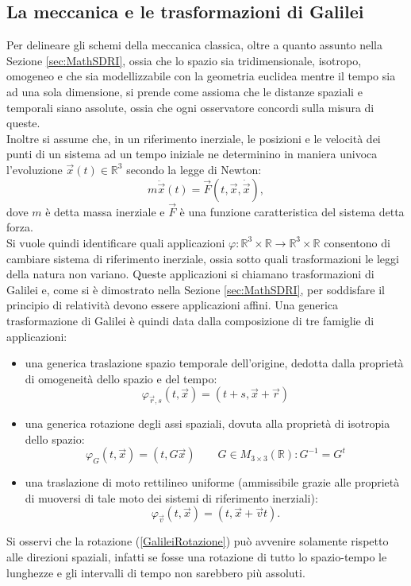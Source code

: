 \subsection{La meccanica e le trasformazioni di Galilei}\label{sec:MC}
Per delineare gli schemi della meccanica classica, oltre a quanto assunto nella Sezione \ref{sec:MathSDRI}, ossia che lo spazio sia tridimensionale, isotropo, omogeneo e che sia modellizzabile con la geometria euclidea mentre il tempo sia ad una sola dimensione, si prende come assioma che le distanze spaziali e temporali siano assolute, ossia che ogni osservatore concordi sulla misura di queste.\\
Inoltre si assume che, in un riferimento inerziale, le posizioni e le velocità dei punti di un sistema ad un tempo iniziale ne determinino in maniera univoca l'evoluzione $\vec x(t)\in \mathbb{R}^3$ secondo la legge di Newton:
\begin{equation}
	m\ddot{\vec{x}}(t)=\vec{F}(t,\vec{x},\dot{\vec{x}}),
	\label{equazioneDiNewton}
\end{equation}
dove $m$ è detta massa inerziale e $\vec{F}$ è una funzione caratteristica del sistema detta forza.\\

Si vuole quindi identificare quali applicazioni $\varphi:\mathbb{R}^3\times\mathbb{R}\rightarrow
\mathbb{R}^3\times\mathbb{R}$ consentono di cambiare sistema di riferimento inerziale, ossia sotto quali 
trasformazioni le leggi della natura non variano. Queste applicazioni si chiamano trasformazioni di 
Galilei e, come si è dimostrato nella Sezione \ref{sec:MathSDRI}, per soddisfare il principio di relatività devono essere applicazioni affini.
Una generica trasformazione di Galilei è quindi data dalla composizione di tre famiglie di applicazioni:
\begin{itemize}
	\item una generica traslazione spazio temporale dell'origine, dedotta dalla proprietà 
	di omogeneità dello spazio e del tempo:
	\begin{equation}
		\varphi_{\vec{r},s}(t,\vec{x})=(t+s,\vec{x}+\vec{r})
		\label{GalileiTraslazoine}
	\end{equation} 
\item una generica rotazione degli assi spaziali, dovuta alla proprietà di isotropia dello spazio:
\begin{equation}
	\varphi_{G}(t,\vec{x})=(t,G\vec{x}) \qquad G\in M_{3\times3}(\mathbb{R}):G^{-1}=G^t
	\label{GalileiRotazione}
\end{equation} 
	\item una traslazione di moto rettilineo uniforme (ammissibile grazie alle proprietà di muoversi di tale moto dei sistemi 
	di riferimento inerziali):
\begin{equation}
	\varphi_{\vec{v}}(t,\vec{x})=(t,\vec{x}+\vec{v}t).
	\label{GalileiVelocità}
\end{equation} 
\end{itemize}
Si osservi che la rotazione (\ref{GalileiRotazione}) può avvenire solamente rispetto alle direzioni spaziali, infatti se fosse una rotazione di tutto lo spazio-tempo le lunghezze e gli intervalli di tempo non sarebbero più assoluti.\\

